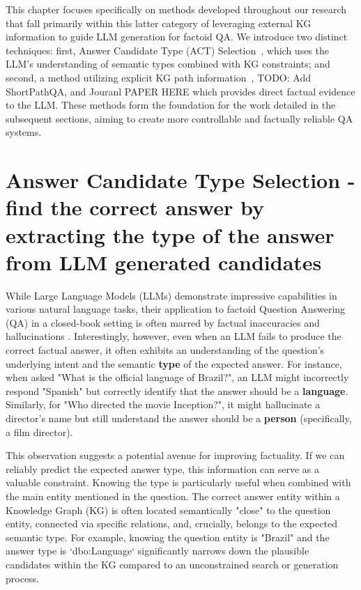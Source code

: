 This chapter focuses specifically on methods developed throughout our research that fall primarily within this latter category of leveraging external KG information to guide LLM generation for factoid QA. We introduce two distinct techniques: first, Answer Candidate Type (ACT) Selection~\cite{DBLP:journals/corr/abs-2310-07008}, which uses the LLM's understanding of semantic types combined with KG constraints; and second, a method utilizing explicit KG path information~\cite{DBLP:journals/corr/abs-2310-02166}, {\color{red}TODO: Add ShortPathQA, and Jouranl PAPER HERE} which provides direct factual evidence to the LLM. These methods form the foundation for the work detailed in the subsequent sections, aiming to create more controllable and factually reliable QA systems.


\section{Answer Candidate Type Selection - find the correct answer by extracting the type of the answer from LLM generated candidates}
\label{sec:methods_type_selection}

While Large Language Models (LLMs) demonstrate impressive capabilities in various natural language tasks, their application to factoid Question Answering (QA) in a closed-book setting is often marred by factual inaccuracies and hallucinations \cite{DBLP:conf/emnlp/RobertsRS20, lin-etal-2022-truthfulqa}. Interestingly, however, even when an LLM fails to produce the correct factual answer, it often exhibits an understanding of the question's underlying intent and the semantic \textbf{type} of the expected answer. For instance, when asked "What is the official language of Brazil?", an LLM might incorrectly respond "Spanish" but correctly identify that the answer should be a \textbf{language}. Similarly, for "Who directed the movie Inception?", it might hallucinate a director's name but still understand the answer should be a \textbf{person} (specifically, a film director).

This observation suggests a potential avenue for improving factuality. If we can reliably predict the expected answer type, this information can serve as a valuable constraint. Knowing the type is particularly useful when combined with the main entity mentioned in the question. The correct answer entity within a Knowledge Graph (KG) is often located semantically "close" to the question entity, connected via specific relations, and, crucially, belongs to the expected semantic type. For example, knowing the question entity is "Brazil" and the answer type is `dbo:Language` significantly narrows down the plausible candidates within the KG compared to an unconstrained search or generation process.

